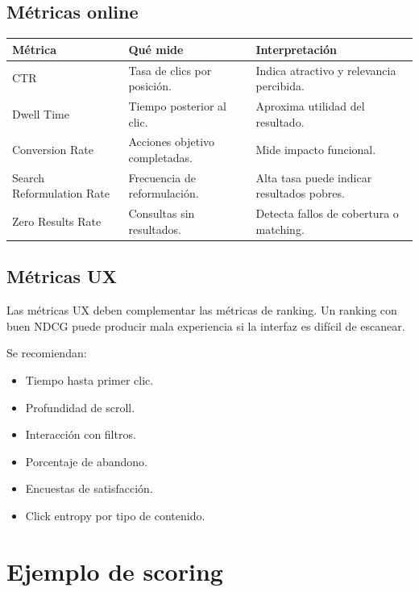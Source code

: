 \documentclass[12pt,a4paper]{article}
\begin{document}
\subsection{Métricas online}

\begin{longtable}{p{4cm}p{5cm}p{5cm}}
\toprule
\textbf{Métrica} & \textbf{Qué mide} & \textbf{Interpretación} \\
\midrule
\endhead

CTR & Tasa de clics por posición. & Indica atractivo y relevancia percibida. \\

Dwell Time & Tiempo posterior al clic. & Aproxima utilidad del resultado. \\

Conversion Rate & Acciones objetivo completadas. & Mide impacto funcional. \\

Search Reformulation Rate & Frecuencia de reformulación. & Alta tasa puede indicar resultados pobres. \\

Zero Results Rate & Consultas sin resultados. & Detecta fallos de cobertura o matching. \\

\bottomrule
\end{longtable}

\subsection{Métricas UX}

Las métricas UX deben complementar las métricas de ranking. Un ranking con buen NDCG puede producir mala experiencia si la interfaz es difícil de escanear.

Se recomiendan:

\begin{itemize}[noitemsep]
    \item Tiempo hasta primer clic.
    \item Profundidad de scroll.
    \item Interacción con filtros.
    \item Porcentaje de abandono.
    \item Encuestas de satisfacción.
    \item Click entropy por tipo de contenido.
\end{itemize}

\section{Ejemplo de scoring}
\end{document}
